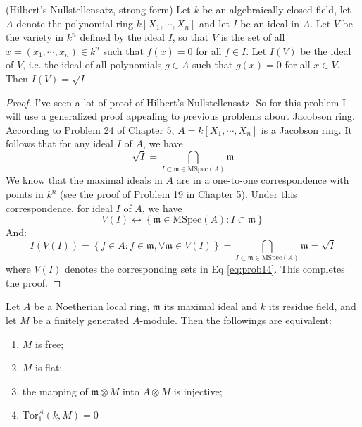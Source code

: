 \documentclass{solution}
\begin{document}
\begin{problem}
    (Hilbert's Nullstellensatz, strong form) Let $k$ be an algebraically closed field, let $A$ denote the polynomial ring $k[X_1, \cdots, X_n]$ and let $I$ be an ideal in $A$. Let $V$ be the variety in $k^n$ defined by the ideal $I$, so that $V$ is the set of all $x = (x_1, \cdots, x_n) \in k^n$ such that $f(x) = 0$ for all $f \in I$. Let $I(V)$ be the ideal of $V$, i.e. the ideal of all polynomials $g \in A$ such that $g(x) = 0$ for all $x \in V$. Then $I(V) = \sqrt{I}$
\end{problem}

\begin{proof}
    I've seen a lot of proof of Hilbert's Nullstellensatz. So for this problem I will use a generalized proof appealing to previous problems about Jacobson ring. According to Problem 24 of Chapter 5, $A = k[X_1, \cdots, X_n]$ is a Jacobson ring. It follows that for any ideal $I$ of $A$, we have
    $$\sqrt{I} = \bigcap\limits_{I \subset \mathfrak{m} \in \mathrm{MSpec}(A) } \mathfrak{m}$$
    We know that the maximal ideals in $A$ are in a one-to-one correspondence with points in $k^n$ (see the proof of Problem 19 in Chapter 5). Under this correspondence, for ideal $I$ of $A$, we have
    \begin{equation} \label{eq:prob14}
        V(I) \leftrightarrow \left\lbrace \mathfrak{m} \in \mathrm{MSpec}(A): I \subset \mathfrak{m} \right\rbrace
    \end{equation}
    And:
    $$I(V(I)) = \left\lbrace f \in A: f \in \mathfrak{m}, \forall \mathfrak{m} \in V(I) \right\rbrace = \bigcap\limits_{I \subset \mathfrak{m} \in \mathrm{MSpec}(A)} \mathfrak{m} = \sqrt{I}$$
    where $V(I)$ denotes the corresponding sets in Eq \ref{eq:prob14}. This completes the proof.
\end{proof}

\begin{problem}
    Let $A$ be a Noetherian local ring, $\mathfrak{m}$ its maximal ideal and $k$ its residue field, and let $M$ be a finitely generated $A$-module. Then the followings are equivalent:
    \begin{enumerate}
        \item $M$ is free;
        \item $M$ is flat;
        \item the mapping of $\mathfrak{m} \otimes M$ into $A \otimes M$ is injective;
        \item $\mathrm{Tor}_{1}^{A}(k, M) = 0$
    \end{enumerate}
\end{problem}
\end{document}
